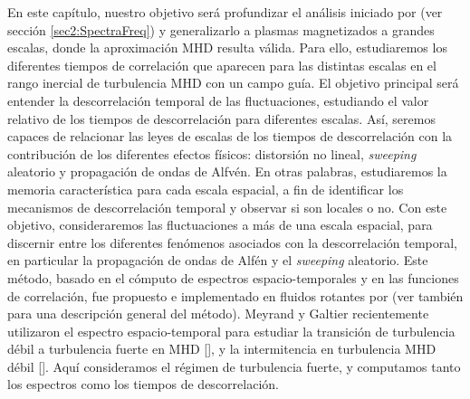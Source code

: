 
En este capítulo, nuestro objetivo será profundizar el análisis
iniciado por \cite{servidio_time_2011} (ver
sección \ref{sec2:SpectraFreq}) y generalizarlo a plasmas magnetizados
a grandes escalas, donde la aproximación MHD resulta válida. Para
ello, estudiaremos los diferentes tiempos de correlación que aparecen
para las distintas escalas en el rango inercial de turbulencia MHD con
un campo guía. El objetivo principal será entender la descorrelación
temporal de las fluctuaciones, estudiando el valor relativo de los
tiempos de descorrelación para diferentes escalas. Así, seremos
capaces de relacionar las leyes de escalas de los tiempos de
descorrelación con la contribución de los diferentes efectos físicos:
distorsión no lineal, \textit{sweeping} aleatorio y propagación de
ondas de Alfv\'en. En otras palabras, estudiaremos la memoria
característica para cada escala espacial, a fin de identificar los
mecanismos de descorrelación temporal y observar si son locales o
no. Con este objetivo, consideraremos las fluctuaciones a más de una
escala espacial, para discernir entre los diferentes fenómenos
asociados con la descorrelación temporal, en particular la propagación
de ondas de Alf\'en y el \textit{sweeping} aleatorio.  Este método,
basado en el cómputo de espectros espacio-temporales y en las
funciones de correlación, fue propuesto e implementado en fluidos
rotantes por
\cite{clark_di_leoni_quantification_2014} (ver también
\cite{clark_di_leoni_spatio-temporal_2015} para una descripción
general del método). Meyrand y Galtier recientemente utilizaron el
espectro espacio-temporal para estudiar la transición de turbulencia
débil a turbulencia fuerte en MHD [\cite{meyrand_direct_2016}], y la
intermitencia en turbulencia MHD débil
[\cite{meyrand_weak_2015}]. Aquí consideramos el régimen de
turbulencia fuerte, y computamos tanto los espectros como los tiempos
de descorrelación.

